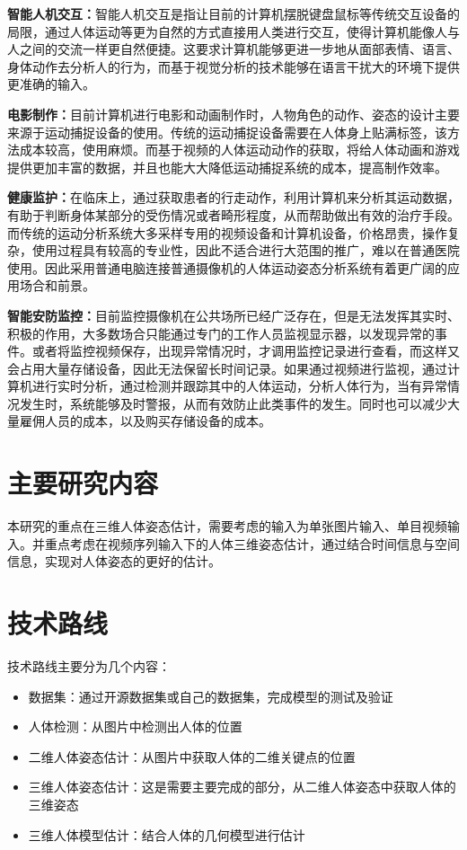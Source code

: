 \textbf{智能人机交互：}智能人机交互是指让目前的计算机摆脱键盘鼠标等传统交互设备的局限，通过人体运动等更为自然的方式直接用人类进行交互，使得计算机能像人与人之间的交流一样更自然便捷。这要求计算机能够更进一步地从面部表情、语言、身体动作去分析人的行为，而基于视觉分析的技术能够在语言干扰大的环境下提供更准确的输入。

\textbf{电影制作：}目前计算机进行电影和动画制作时，人物角色的动作、姿态的设计主要来源于运动捕捉设备的使用。传统的运动捕捉设备需要在人体身上贴满标签，该方法成本较高，使用麻烦。而基于视频的人体运动动作的获取，将给人体动画和游戏提供更加丰富的数据，并且也能大大降低运动捕捉系统的成本，提高制作效率。


\textbf{健康监护：}在临床上，通过获取患者的行走动作，利用计算机来分析其运动数据，有助于判断身体某部分的受伤情况或者畸形程度，从而帮助做出有效的治疗手段。而传统的运动分析系统大多采样专用的视频设备和计算机设备，价格昂贵，操作复杂，使用过程具有较高的专业性，因此不适合进行大范围的推广，难以在普通医院使用。因此采用普通电脑连接普通摄像机的人体运动姿态分析系统有着更广阔的应用场合和前景。

\textbf{智能安防监控：}目前监控摄像机在公共场所已经广泛存在，但是无法发挥其实时、积极的作用，大多数场合只能通过专门的工作人员监视显示器，以发现异常的事件。或者将监控视频保存，出现异常情况时，才调用监控记录进行查看，而这样又会占用大量存储设备，因此无法保留长时间记录。如果通过视频进行监视，通过计算机进行实时分析，通过检测并跟踪其中的人体运动，分析人体行为，当有异常情况发生时，系统能够及时警报，从而有效防止此类事件的发生。同时也可以减少大量雇佣人员的成本，以及购买存储设备的成本。



\section{主要研究内容}
本研究的重点在三维人体姿态估计，需要考虑的输入为单张图片输入、单目视频输入。并重点考虑在视频序列输入下的人体三维姿态估计，通过结合时间信息与空间信息，实现对人体姿态的更好的估计。

\section{技术路线}
技术路线主要分为几个内容：
\begin{itemize}
    \item 数据集：通过开源数据集或自己的数据集，完成模型的测试及验证
    \item 人体检测：从图片中检测出人体的位置
    \item 二维人体姿态估计：从图片中获取人体的二维关键点的位置
    \item 三维人体姿态估计：这是需要主要完成的部分，从二维人体姿态中获取人体的三维姿态
    \item 三维人体模型估计：结合人体的几何模型进行估计
\end{itemize}

